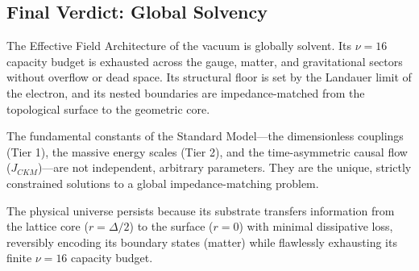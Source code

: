 \subsection{Final Verdict: Global Solvency}
The Effective Field Architecture of the vacuum is globally solvent. Its $\nu = 16$ capacity budget is exhausted across the gauge, matter, and gravitational sectors without overflow or dead space. Its structural floor is set by the Landauer limit of the electron, and its nested boundaries are impedance-matched from the topological surface to the geometric core.

The fundamental constants of the Standard Model—the dimensionless couplings (Tier 1), the massive energy scales (Tier 2), and the time-asymmetric causal flow ($J_{CKM}$)—are not independent, arbitrary parameters. They are the unique, strictly constrained solutions to a global impedance-matching problem. 

The physical universe persists because its substrate transfers information from the lattice core ($r = \Delta/2$) to the surface ($r = 0$) with minimal dissipative loss, reversibly encoding its boundary states (matter) while flawlessly exhausting its finite $\nu=16$ capacity budget.